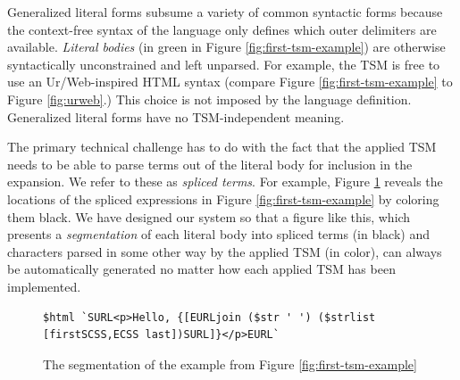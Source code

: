 Generalized literal forms subsume a variety of common syntactic forms because the context-free syntax of the language only defines which outer delimiters are available. \emph{Literal bodies} (in green in Figure \ref{fig:first-tsm-example}) are otherwise syntactically unconstrained and left unparsed. For example, the  TSM is free to use an Ur/Web-inspired HTML syntax (compare Figure \ref{fig:first-tsm-example} to Figure \ref{fig:urweb}.) This choice is not imposed by the language definition. Generalized literal forms have no TSM-independent meaning.


The primary technical challenge has to do with the fact that the applied TSM needs to be able to parse terms out of the literal body for inclusion in the expansion. We refer to these as \emph{spliced terms}. For example, Figure \ref{fig:first-tsm-example-marked} reveals the locations of the spliced expressions in Figure \ref{fig:first-tsm-example} by coloring them black. We have designed our system so that a figure like this, which presents a \emph{segmentation} of each literal body into spliced terms (in black) and characters parsed in some other way by the applied TSM (in color), can always be automatically generated no matter how each applied TSM has been implemented. 

\begin{figure}[h]
\begin{lstlisting}[numbers=none,xleftmargin=0px]
$html `SURL<p>Hello, {[EURLjoin ($str ' ') ($strlist [firstSCSS,ECSS last])SURL]}</p>EURL`
\end{lstlisting}
\caption{The segmentation of the example from Figure \ref{fig:first-tsm-example}}
\label{fig:first-tsm-example-marked}
\end{figure}

